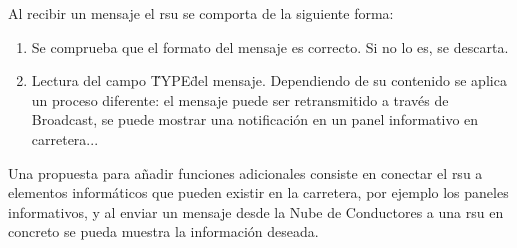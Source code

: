 Al recibir un mensaje el \gls{rsu} se comporta de la siguiente forma:
\begin{enumerate}
	\item Se comprueba que el formato del mensaje es correcto. Si no lo es, se descarta.
	\item Lectura del campo \"TYPE\" del mensaje. Dependiendo de su contenido se aplica un proceso diferente: el mensaje puede ser retransmitido a través de Broadcast, se puede mostrar una notificación en un panel informativo en carretera...
\end{enumerate}
		
Una propuesta para añadir funciones adicionales consiste en conectar el \gls{rsu} a elementos informáticos que pueden existir en la carretera, por ejemplo los paneles informativos, y al enviar un mensaje desde la Nube de Conductores a una \gls{rsu} en concreto se pueda muestra la información deseada.